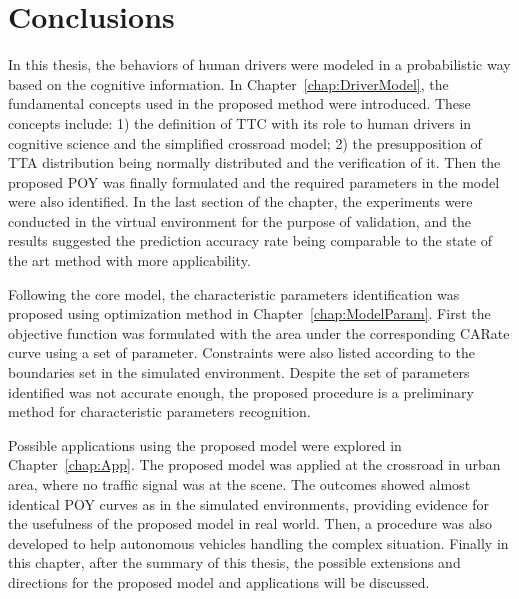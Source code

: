 

\section{Conclusions}
\label{sec:conclusion}
In this thesis, the behaviors of human drivers were modeled in a probabilistic way based on the cognitive information. In Chapter~\ref{chap:DriverModel}, the fundamental concepts used in the proposed method were introduced. These concepts include: 1) the definition of TTC with its role to human drivers in cognitive science and the simplified crossroad model; 2) the presupposition of TTA distribution being normally distributed and the verification of it. Then the proposed POY was finally formulated and the required parameters in the model were also identified. In the last section of the chapter, the experiments were conducted in the virtual environment for the purpose of validation, and the results suggested the prediction accuracy rate being comparable to the state of the art method with more applicability.

Following the core model, the characteristic parameters identification was proposed using optimization method in Chapter~\ref{chap:ModelParam}. First the objective function was formulated with the area under the corresponding CARate curve using a set of parameter. Constraints were also listed according to the boundaries set in the simulated environment. Despite the set of parameters identified was not accurate enough, the proposed procedure is a preliminary method for characteristic parameters recognition.

Possible applications using the proposed model were explored in Chapter~\ref{chap:App}. The proposed model was applied at the crossroad in urban area, where no traffic signal was at the scene. The outcomes showed almost identical POY curves as in the simulated environments, providing evidence for the usefulness of the proposed model in real world. Then, a procedure was also developed to help autonomous vehicles handling the complex situation. Finally in this chapter, after the summary of this thesis, the possible extensions and directions for the proposed model and applications will be discussed.



